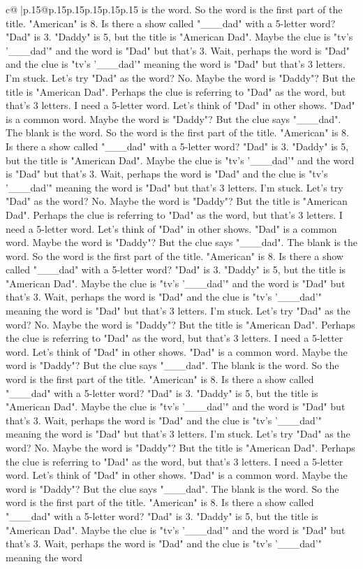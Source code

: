 \documentclass{article}
\begin{document}
{\begin{supertabular}{c@{$\;$}|p{.15\linewidth}@{}p{.15\linewidth}p{.15\linewidth}p{.15\linewidth}p{.15\linewidth}p{.15\linewidth}}
{{{is the word. So the word is the first part of the title. "American" is 8. Is there a show called "\_\_\_dad" with a 5{-}letter word? "Dad" is 3. "Daddy" is 5, but the title is "American Dad". Maybe the clue is "tv's '\_\_\_dad'" and the word is "Dad" but that's 3. Wait, perhaps the word is "Dad" and the clue is "tv's '\_\_\_dad'" meaning the word is "Dad" but that's 3 letters. I'm stuck. Let's try "Dad" as the word? No. Maybe the word is "Daddy"? But the title is "American Dad". Perhaps the clue is referring to "Dad" as the word, but that's 3 letters. I need a 5{-}letter word. Let's think of "Dad" in other shows. "Dad" is a common word. Maybe the word is "Daddy"? But the clue says "\_\_\_dad". The blank is the word. So the word is the first part of the title. "American" is 8. Is there a show called "\_\_\_dad" with a 5{-}letter word? "Dad" is 3. "Daddy" is 5, but the title is "American Dad". Maybe the clue is "tv's '\_\_\_dad'" and the word is "Dad" but that's 3. Wait, perhaps the word is "Dad" and the clue is "tv's '\_\_\_dad'" meaning the word is "Dad" but that's 3 letters. I'm stuck. Let's try "Dad" as the word? No. Maybe the word is "Daddy"? But the title is "American Dad". Perhaps the clue is referring to "Dad" as the word, but that's 3 letters. I need a 5{-}letter word. Let's think of "Dad" in other shows. "Dad" is a common word. Maybe the word is "Daddy"? But the clue says "\_\_\_dad". The blank is the word. So the word is the first part of the title. "American" is 8. Is there a show called "\_\_\_dad" with a 5{-}letter word? "Dad" is 3. "Daddy" is 5, but the title is "American Dad". Maybe the clue is "tv's '\_\_\_dad'" and the word is "Dad" but that's 3. Wait, perhaps the word is "Dad" and the clue is "tv's '\_\_\_dad'" meaning the word is "Dad" but that's 3 letters. I'm stuck. Let's try "Dad" as the word? No. Maybe the word is "Daddy"? But the title is "American Dad". Perhaps the clue is referring to "Dad" as the word, but that's 3 letters. I need a 5{-}letter word. Let's think of "Dad" in other shows. "Dad" is a common word. Maybe the word is "Daddy"? But the clue says "\_\_\_dad". The blank is the word. So the word is the first part of the title. "American" is 8. Is there a show called "\_\_\_dad" with a 5{-}letter word? "Dad" is 3. "Daddy" is 5, but the title is "American Dad". Maybe the clue is "tv's '\_\_\_dad'" and the word is "Dad" but that's 3. Wait, perhaps the word is "Dad" and the clue is "tv's '\_\_\_dad'" meaning the word is "Dad" but that's 3 letters. I'm stuck. Let's try "Dad" as the word? No. Maybe the word is "Daddy"? But the title is "American Dad". Perhaps the clue is referring to "Dad" as the word, but that's 3 letters. I need a 5{-}letter word. Let's think of "Dad" in other shows. "Dad" is a common word. Maybe the word is "Daddy"? But the clue says "\_\_\_dad". The blank is the word. So the word is the first part of the title. "American" is 8. Is there a show called "\_\_\_dad" with a 5{-}letter word? "Dad" is 3. "Daddy" is 5, but the title is "American Dad". Maybe the clue is "tv's '\_\_\_dad'" and the word is "Dad" but that's 3. Wait, perhaps the word is "Dad" and the clue is "tv's '\_\_\_dad'" meaning the word }}}
\end{supertabular}}
\end{document}
